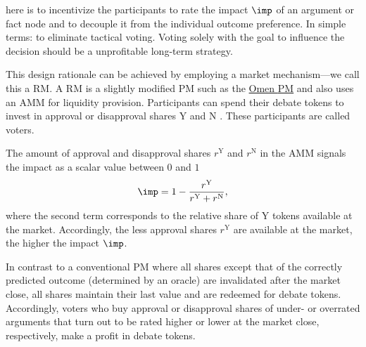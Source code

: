 \documentclass[%
aip,
amsmath,amssymb,
reprint,%
unsortedaddress,
nofootinbib
]{revtex4-2}
\newcommand{\Y}{\text{Y}}
\newcommand{\N}{\text{N}}
\begin{document}
 here is to incentivize the participants to 
rate the impact $\imp$ of an argument or fact node
and to decouple it from the individual outcome preference. 
In simple terms: to eliminate tactical voting.
Voting solely with the goal to influence the decision should be a unprofitable long-term strategy.

This design rationale can be achieved by employing a market mechanism---we call this a \ac{RM}.
A \ac{RM} is a slightly modified \ac{PM} such as the \href{https://omen.eth.link/}{Omen \ac{PM}}\cite{Omen2020} and also uses an \ac{AMM}\cite{Zhang2018} for liquidity provision.
Participants can spend their debate tokens to invest in approval or disapproval shares $\Y$ and $\N$
.
These participants are called voters.

The amount of approval and disapproval shares $r^\Y$ and $r^\N$ in the \ac{AMM}
signals the impact as a scalar value between $0$ and $1$
\begin{equation}
	\imp = 1-\frac{r^\Y}{r^\Y+r^\N},
\end{equation}
where the second term corresponds to the relative share of $\Y$ tokens available at the market.
Accordingly, the less approval shares $r^\Y$ are available at the market, the higher the impact $\imp$.


In contrast to a conventional \ac{PM} where all shares except that of the correctly predicted outcome (determined by an oracle) are invalidated after the market close,
all shares maintain their last value and are redeemed for debate tokens. 
Accordingly, voters who buy approval or disapproval shares of under- or overrated arguments that turn out to be rated higher or lower at the market close, respectively, make a profit in debate tokens.
\end{document}
